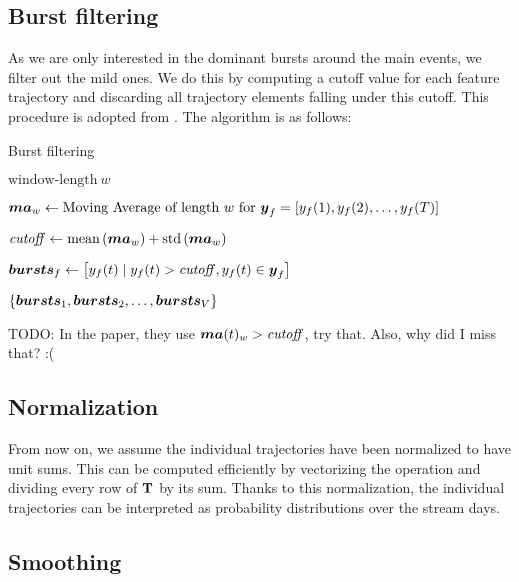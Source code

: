 \subsection{Burst filtering}
As we are only interested in the dominant bursts around the main events, we filter out the mild ones. We do this by computing a cutoff value for each feature trajectory and discarding all trajectory elements falling under this cutoff. This procedure is adopted from \cite{online-search-queries}. The algorithm is as follows:

\begin{algorithm}[H]
\begin{algorithmic}[1]
\caption{Burst filtering}
\Input $\text{window-length} ~ w$

	\State $\vect{MA}_{w} \gets \text{Moving Average of length} ~ w ~ \text{for} ~ \vect{\traj}_{f} = \left[ \traj_{f}(1), \traj_{f}(2), \dots, \traj_{f}(\streamlen) \right]$

	\State $\mathit{cutoff} \gets \text{mean} \left( \vect{MA}_{w} \right) + \text{std} \left( \vect{MA}_{w} \right)$

	\State $\vect{bursts}_{f} \gets \left[ \traj_{f}(t) \mid \traj_{f}(t) > \mathit{cutoff}, \traj_{f}(t) \in \vect{y}_{f} \right]$
\EndFor

\Output $\{ \vect{bursts}_{1}, \vect{bursts}_{2}, \dots, \vect{bursts}_{\featcount} \}$

\end{algorithmic}
\end{algorithm}

{\color{red} TODO: In the paper, they use $\vect{MA}(t)_{w} > \mathit{cutoff}$, try that. Also, why did I miss that? :(}

\subsection{Normalization}
From now on, we assume the individual trajectories have been normalized to have unit sums. This can be computed efficiently by vectorizing the operation and dividing every row of $\mathbf{T}$ by its sum. Thanks to this normalization, the individual trajectories can be interpreted as probability distributions over the stream days.

\subsection{Smoothing}

